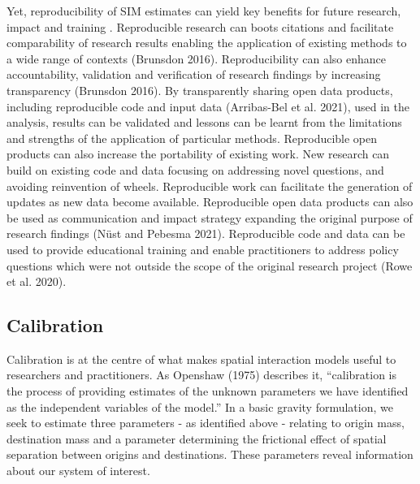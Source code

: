 \documentclass[11pt,letterpaper]{article}
\begin{document}
Yet, reproducibility of SIM estimates can yield key benefits for future research, impact and training .
Reproducible research can boots citations and facilitate comparability of research results enabling the application of existing methods to a wide range of contexts (Brunsdon 2016).
Reproducibility can also enhance accountability, validation and verification of research findings by increasing transparency (Brunsdon 2016).
By transparently sharing open data products, including reproducible code and input data (Arribas-Bel et al. 2021), used in the analysis, results can be validated and lessons can be learnt from the limitations and strengths of the application of particular methods.
Reproducible open products can also increase the portability of existing work.
New research can build on existing code and data focusing on addressing novel questions, and avoiding reinvention of wheels.
Reproducible work can facilitate the generation of updates as new data become available.
Reproducible open data products can also be used as communication and impact strategy expanding the original purpose of research findings (Nüst and Pebesma 2021).
Reproducible code and data can be used to provide educational training and enable practitioners to address policy questions which were not outside the scope of the original research project (Rowe et al. 2020).

\hypertarget{calibration}{%
\subsection{Calibration}\label{calibration}}

Calibration is at the centre of what makes spatial interaction models useful to researchers and practitioners.
As Openshaw (1975) describes it, ``calibration is the process of providing estimates of the unknown parameters we have identified as the independent variables of the model.'' In a basic gravity formulation, we seek to estimate three parameters - as identified above - relating to origin mass, destination mass and a parameter determining the frictional effect of spatial separation between origins and destinations.
These parameters reveal information about our system of interest.
\end{document}
